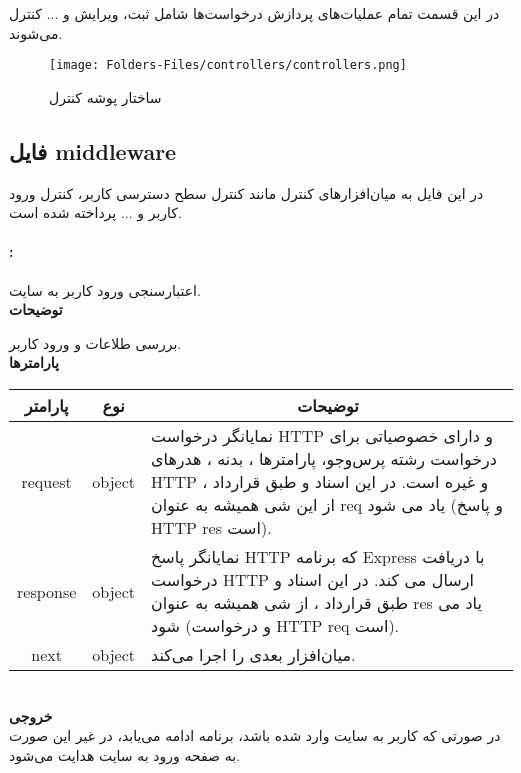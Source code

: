
در این قسمت تمام عملیات‌های پردازش درخواست‌ها شامل ثبت، ویرایش و ... کنترل می‌شوند.

\begin{figure}[H]
	\texttt{[image: Folders-Files/controllers/controllers.png]}
	\centering
	\caption{ساختار پوشه کنترل}
	\label{fig:folder:controllers}
\end{figure}

\subsection{فایل middleware}
در این فایل به میان‌افزارهای کنترل‌ مانند کنترل سطح دسترسی کاربر، کنترل ورود کاربر و ... پرداخته شده است.

\paragraph{:}
اعتبارسنجی ورود کاربر به سایت.
\\
\textbf{توضیحات}
\hr
\begin{flushleft}
	\framebox[.9\textwidth][l]{
		\lr{
			\textcolor{type}{void}
			\textcolor{func}{logInChecker}
			\textcolor{symb}{(}
			\textcolor{type}{object}
			\textcolor{arg}{request}
			\textcolor{symb}{,}
			\textcolor{type}{object}
			\textcolor{arg}{response}
			\textcolor{symb}{,}
			\textcolor{type}{object}
			\textcolor{arg}{next}
			\textcolor{symb}{);}
		}
	}
\end{flushleft}
بررسی طلاعات و ورود کاربر.
\\
\textbf{پارامترها}
\hr \\[10pt]
\begin{tabular}{|m{4cm}|m{3cm}|m{10cm}|}
	\hline
	\multicolumn{1}{|c}{پارامتر}
	&
	\multicolumn{1}{|c}{نوع}
	&
	\multicolumn{1}{|c|}{توضیحات}
	\\
	\hline
	\multicolumn{1}{|c}{request}
	&
	\multicolumn{1}{|c|}{object}
	&
	نمایانگر درخواست HTTP و دارای خصوصیاتی برای درخواست رشته پرس‌و‌جو، پارامترها ، بدنه ، هدرهای HTTP و غیره است.
	در این اسناد و طبق قرارداد ، از این شی همیشه به عنوان req یاد می شود (و پاسخ HTTP res است).
	\\
	\hline
	\multicolumn{1}{|c}{response}
	&
	\multicolumn{1}{|c|}{object}
	&
	نمایانگر پاسخ HTTP که برنامه Express با دریافت درخواست HTTP ارسال می کند.
	در این اسناد و طبق قرارداد ، از شی همیشه به عنوان res یاد می شود (و درخواست HTTP req است).
	\\
	\hline
	\multicolumn{1}{|c}{next}
	&
	\multicolumn{1}{|c|}{object}
	&
 میان‌افزار بعدی را اجرا می‌کند.
	\\
	\hline
\end{tabular}
\\[10pt]
\textbf{خروجی}
\hr \\
در صورتی که کاربر به سایت وارد شده باشد، برنامه ادامه می‌یابد، در غیر این صورت به صفحه ورود به سایت هدایت می‌شود.

